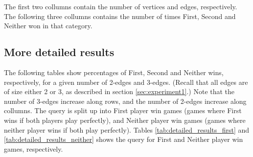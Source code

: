 The first two collumns contain the number of vertices and edges, respectively. The following three collumns contains the number of times First, Second and Neither won in that category.

\subsection{More detailed results}

The following tables show percentages of First, Second and Neither wins, respectively, for a given number of 2-edges and 3-edges.
(Recall that all edges are of size either 2 or 3, as described in section \ref{sec:experiment1}.)
Note that the number of 3-edges increase along rows, and the number of 2-edges increase along collumns.
The query is split up into First player win games (games where First wins if both players play perfectly), and Neither player win games (games where neither player wins if both play perfectly).
Tables \ref{tab:detailed_results_first} and \ref{tab:detailed_results_neither} shows the query for First and Neither player win games, respectively.

\restoregeometry

